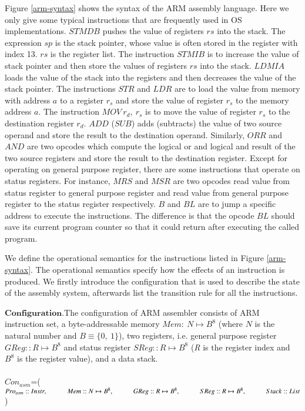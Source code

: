 \documentclass[letterpaper, 10 pt, conference]{IEEEtran}
\begin{document}
\par Figure \ref{arm-syntax} shows the syntax of the ARM assembly language. Here we only give some typical instructions that are frequently used in OS implementations. $STMDB$ pushes the value of registers $rs$ into the stack. The expression $sp$ is the stack pointer, whose value is often stored in the register with index 13. $rs$ is the register list. The instruction $STMIB$ is to increase the value of stack pointer and then store the values of registers $rs$ into the stack. $LDMIA$ loads the value of the stack into the registers and then decreases the value of the stack pointer. The instructions $STR$ and $LDR$ are to load the value from memory with address $a$ to a register $r_s$ and store the value of register $r_s$ to the memory address $a$. The instruction $MOV~r_d,~r_s$ is to move the value of register $r_s$ to the destination register $r_d$. $ADD$ ($SUB$) adds (subtracts) the value of two source operand and store the result to the destination operand. Similarly, $ORR$ and $AND$ are two opcodes which compute the logical or and logical and result of the two source registers and store the result to the destination register. Except for operating on general purpose register, there are some instructions that operate on status registers. For instance, $MRS$ and $MSR$ are two opcodes read value from status register to general purpose register and read value from general purpose register to the status register respectively. $B$ and $BL$ are to jump a specific address to execute the instructions. The difference is that the opcode $BL$ should save its current program counter so that it could return after executing the called program.
\par We define the operational semantics for the instructions listed in Figure \ref{arm-syntax}. The operational semantics specify how the effects of an instruction is produced. We firstly introduce the configuration that is used to describe the state of the assembly system, afterwards list the transition rule for all the instructions.
\par $\textbf{Configuration.} $The configuration of ARM assembler consists of ARM instruction set, a byte-addressable memory $Mem:~N\mapsto B^8$ (where $N$ is the natural number and $B\equiv \{0,~1\}$), two registers, i.e. general purpose register $GReg::\textit{R}\mapsto B^8$ and status register $SReg::\textit{R}\mapsto B^8$ (\textit{R} is the register index and $B^8$ is the register value), and a data stack.\\ \\
$Con_{asm}$=($Pro_{asm}::Instr,\\~~~~~~~~~~~~Mem::N\mapsto B^8,\\~~~~~~~~~~~~GReg::\textit{R}\mapsto B^8,\\~~~~~~~~~~~~SReg::\textit{R}\mapsto B^8,\\~~~~~~~~~~~~Stack::List$)\\
\end{document}
